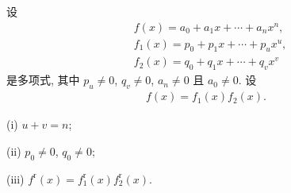 \begin{proposition}
    设
    \begin{align*}
         & f(x) = a_0 + a_1 x + \cdots + a_n x^n,    \\
         & f_1 (x) = p_0 + p_1 x + \cdots + p_u x^u, \\
         & f_2 (x) = q_0 + q_1 x + \cdots + q_v x^v
    \end{align*}
    是多项式, 其中 $p_u \neq 0$, $q_v \neq 0$, $a_n \neq 0$ 且 $a_0 \neq 0$. 设
    \begin{align*}
        f(x) = f_1 (x) f_2 (x).
    \end{align*}

    (i) $u + v = n$;

    (ii) $p_0 \neq 0$, $q_0 \neq 0$;

    (iii) $f^{\mathrm{r}} (x) = f_1^{\mathrm{r}} (x) f_2^{\mathrm{r}} (x)$.
\end{proposition}

